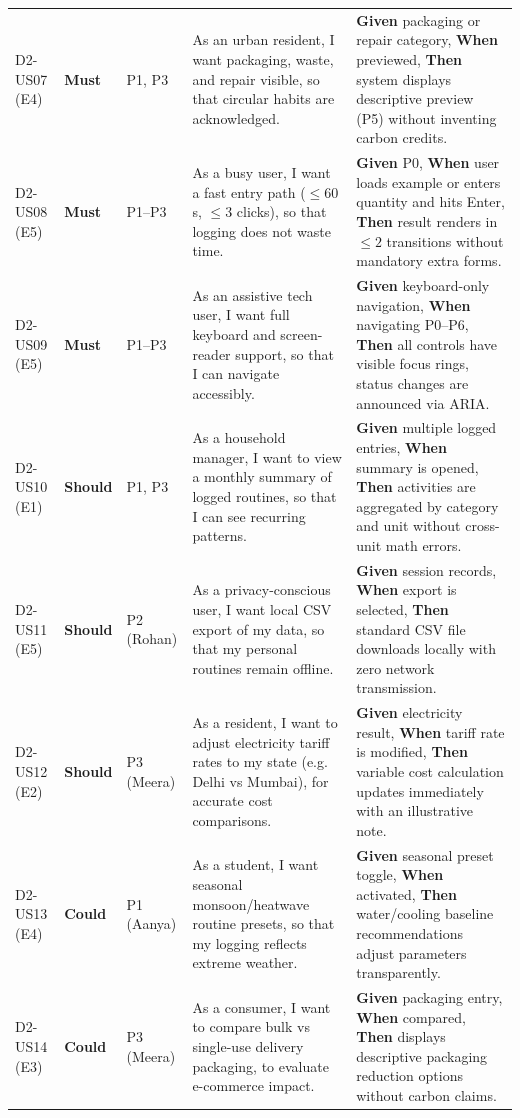 \documentclass[12pt,a4paper]{article}
\begin{document}
\begin{table}[ht]
\begin{tabularx}{\textwidth}{@{}p{1.2cm}p{1.2cm}p{1.5cm}Xp{5.0cm}@{}}
D2-US07 (E4) & \textbf{Must} & P1, P3 & As an urban resident, I want packaging, waste, and repair visible, so that circular habits are acknowledged. & \textbf{Given} packaging or repair category, \textbf{When} previewed, \textbf{Then} system displays descriptive preview (P5) without inventing carbon credits.\\
D2-US08 (E5) & \textbf{Must} & P1--P3 & As a busy user, I want a fast entry path ($\le 60$s, $\le 3$ clicks), so that logging does not waste time. & \textbf{Given} P0, \textbf{When} user loads example or enters quantity and hits Enter, \textbf{Then} result renders in $\le 2$ transitions without mandatory extra forms.\\
D2-US09 (E5) & \textbf{Must} & P1--P3 & As an assistive tech user, I want full keyboard and screen-reader support, so that I can navigate accessibly. & \textbf{Given} keyboard-only navigation, \textbf{When} navigating P0--P6, \textbf{Then} all controls have visible focus rings, status changes are announced via ARIA.\\
\midrule
D2-US10 (E1) & \textbf{Should} & P1, P3 & As a household manager, I want to view a monthly summary of logged routines, so that I can see recurring patterns. & \textbf{Given} multiple logged entries, \textbf{When} summary is opened, \textbf{Then} activities are aggregated by category and unit without cross-unit math errors.\\
D2-US11 (E5) & \textbf{Should} & P2 (Rohan) & As a privacy-conscious user, I want local CSV export of my data, so that my personal routines remain offline. & \textbf{Given} session records, \textbf{When} export is selected, \textbf{Then} standard CSV file downloads locally with zero network transmission.\\
D2-US12 (E2) & \textbf{Should} & P3 (Meera) & As a resident, I want to adjust electricity tariff rates to my state (e.g. Delhi vs Mumbai), for accurate cost comparisons. & \textbf{Given} electricity result, \textbf{When} tariff rate is modified, \textbf{Then} variable cost calculation updates immediately with an illustrative note.\\
\midrule
D2-US13 (E4) & \textbf{Could} & P1 (Aanya) & As a student, I want seasonal monsoon/heatwave routine presets, so that my logging reflects extreme weather. & \textbf{Given} seasonal preset toggle, \textbf{When} activated, \textbf{Then} water/cooling baseline recommendations adjust parameters transparently.\\
D2-US14 (E3) & \textbf{Could} & P3 (Meera) & As a consumer, I want to compare bulk vs single-use delivery packaging, to evaluate e-commerce impact. & \textbf{Given} packaging entry, \textbf{When} compared, \textbf{Then} displays descriptive packaging reduction options without carbon claims.\\

\end{tabularx}
\end{table}
\end{document}
